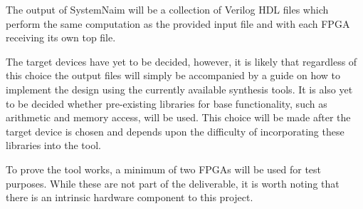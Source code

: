 The output of SystemNaim will be a collection of Verilog HDL files which perform the same computation as the provided input file and with each FPGA receiving its own top file.

The target devices have yet to be decided, however, it is likely that regardless of this choice the output files will simply be accompanied by a guide on how to implement the design using the currently available synthesis tools. It is also yet to be decided whether pre-existing libraries for base functionality, such as arithmetic and memory access, will be used. This choice will be made after the target device is chosen and depends upon the difficulty of incorporating these libraries into the tool.

To prove the tool works, a minimum of two FPGAs will be used for test purposes. While these are not part of the deliverable, it is worth noting that there is an intrinsic hardware component to this project.